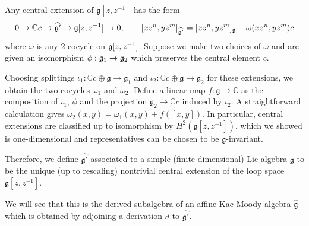 \documentclass[12pt]{article}
\begin{document}
\begin{definition}
    Any central extension of $\mathfrak{g}[z,z^{-1}]$ has the form
    \[
        0 \to \mathbb{C}c \to \widehat{\mathfrak{g}'} \to \mathfrak{g}[z,z^{-1}] \to 0,
        \qquad
    [xz^n, yz^m]_{\widehat{\mathfrak{g}'}} = [xz^n,yz^m]_{\mathfrak{g}} + \omega(xz^n,yz^m)c
    \]
    where $\omega$ is any 2-cocycle on $\mathfrak{g}[z,z^{-1}]$. Suppose we make two choices of $\omega$ and are given an isomorphism $\phi:\mathfrak{g}_1 \to \mathfrak{g}_2$ which preserves the central element $c$. 
    
    Choosing splittings $\iota_1: \mathbb{C}c \oplus \mathfrak{g} \to \mathfrak{g}_1$ and $\iota_2: \mathbb{C}c \oplus \mathfrak{g} \to \mathfrak{g}_2$ for these extensions, we obtain the two-cocycles $\omega_1$ and $\omega_2$. Define a linear map $f: \mathfrak{g} \to \mathbb{C}$ as the composition of $\iota_1$, $\phi$ and the projection $\mathfrak{g}_2 \to \mathbb{C}c$ induced by $\iota_2$. A straightforward calculation gives $\omega_2(x,y) = \omega_1(x,y) + f([x,y])$. In particular, central extensions are classified up to isomorphism by $H^2(\mathfrak{g}[z,z^{-1}])$, which we showed is one-dimensional and representatives can be chosen to be $\mathfrak{g}$-invariant.

    Therefore, we define $\widehat{\mathfrak{g}'}$ associated to a simple (finite-dimensional) Lie algebra $\mathfrak{g}$ to be the unique (up to rescaling) nontrivial central extension of the loop space $\mathfrak{g}[z,z^{-1}]$.
\end{definition}

    We will see that this is the derived subalgebra of an affine Kac-Moody algebra $\widehat{\mathfrak{g}}$ which is obtained by adjoining a derivation $d$ to $\widehat{\mathfrak{g}'}$.
\end{document}
